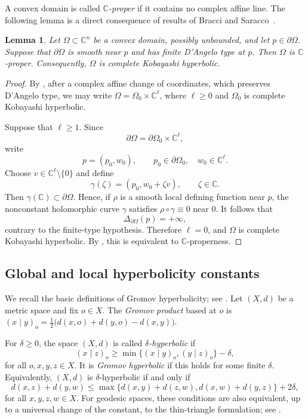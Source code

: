 \documentclass[11pt]{article}
\newtheorem{lemma}[theorem]{Lemma}
\theoremstyle{definition}
\newcommand{\C}{\mathbb{C}}
\begin{document}
A convex domain is called \emph{\(\C\)-proper} if it contains no
complex affine line.  The following lemma is a direct consequence of results
of Bracci and Saracco~\cite{BracciSaracco}.


\begin{lemma}\label{lem:finite-type-c-proper}
Let \(\Omega\subset\C^n\) be a convex domain, possibly unbounded, and
let \(p\in\partial\Omega\).  Suppose that \(\partial\Omega\) is smooth
near \(p\) and has finite D'Angelo type at \(p\).  Then \(\Omega\) is
\(\C\)-proper.  Consequently, \(\Omega\) is complete Kobayashi
hyperbolic.
\end{lemma}

\begin{proof}
By \cite[Proposition~1.2]{BracciSaracco}, after a complex affine change
of coordinates, which preserves D'Angelo type, we may write
\(\Omega=\Omega_0\times\C^\ell\),
where \(\ell\ge0\) and \(\Omega_0\) is complete Kobayashi hyperbolic.

Suppose that \(\ell\ge1\). Since
\[
\partial\Omega=\partial\Omega_0\times\C^\ell,
\]
write
\[
p=(p_0,w_0),\qquad p_0\in\partial\Omega_0,\quad w_0\in\C^\ell.
\]
Choose \(v\in\C^\ell\setminus\{0\}\) and define
\[
\gamma(\zeta)=(p_0,w_0+\zeta v),\qquad \zeta\in\C.
\]
Then \(\gamma(\C)\subset\partial\Omega\). Hence, if \(\rho\) is a smooth local defining function near \(p\), the nonconstant holomorphic curve \(\gamma\) satisfies
\(\rho\circ\gamma\equiv0\)
near \(0\).  It follows that
\[
\Delta_{\partial\Omega}(p)=+\infty,
\]
contrary to the finite-type hypothesis.  Therefore \(\ell=0\), and
\(\Omega\) is complete Kobayashi hyperbolic.  By
\cite[Theorem~1.1]{BracciSaracco}, this is equivalent to
\(\C\)-properness.
\end{proof}

\subsection{Global and local hyperbolicity constants}\label{sub2.5}

We recall the basic definitions of Gromov hyperbolicity; see
\cite{Gromov,BridsonHaefliger}.  Let \((X,d)\) be a metric space and
fix \(o\in X\).  The \emph{Gromov product} based at \(o\) is
\((x\mid y)_o=\frac12\bigl(d(x,o)+d(y,o)-d(x,y)\bigr)\).

For \(\delta\ge0\), the space \((X,d)\) is called
\emph{\(\delta\)-hyperbolic} if
\begin{equation}\label{eq:gromov-product-inequality}
(x\mid z)_o
\ge
\min\{(x\mid y)_o,(y\mid z)_o\}-\delta,
\end{equation}
for all \(o,x,y,z\in X\).  It is \emph{Gromov hyperbolic} if this holds
for some finite \(\delta\).  Equivalently, \((X,d)\) is
\(\delta\)-hyperbolic if and only if
\begin{equation*}
d(x,z)+d(y,w)
\le
\max\{d(x,y)+d(z,w),d(x,w)+d(y,z)\}
+2\delta,
\end{equation*}
for all \(x,y,z,w\in X\).  For geodesic spaces, these conditions are
also equivalent, up to a universal change of the constant, to the
thin-triangle formulation; see
\cite[Chapter~III.H]{BridsonHaefliger}.
\end{document}
